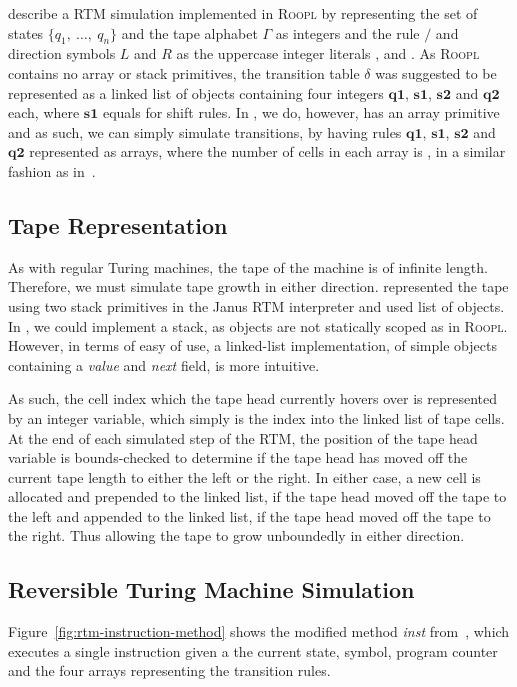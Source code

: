 \citeauthor{th:roopl} describe a RTM simulation implemented in \textsc{Roopl} by representing the set of states $\{q_1,\ \dots,\ q_n\}$ and the tape alphabet $\Gamma$ as integers and the rule $/$ and direction symbols $L$ and $R$ as the uppercase integer literals ,  and . As \textsc{Roopl} contains no array or stack primitives, the transition table $\delta$ was suggested to be represented as a linked list of objects containing four integers ${\textbf{q1}}$, ${\textbf{s1}}$, ${\textbf{s2}}$ and ${\textbf{q2}}$ each, where ${\textbf{s1}}$ equals  for shift rules. In \rooplpp, we do, however, has an array primitive and as such, we can simply simulate transitions, by having rules ${\textbf{q1}}$, ${\textbf{s1}}$, ${\textbf{s2}}$ and ${\textbf{q2}}$ represented as arrays, where the number of cells in each array is , in a similar fashion as in~\cite{ty:ejanus}.

\subsection{Tape Representation}
\label{subsec:tape-representation}
As with regular Turing machines, the tape of the machine is of infinite length. Therefore, we must simulate tape growth in either direction.
\citeauthor{ty:ejanus} represented the tape using two stack primitives in the Janus RTM interpreter and \citeauthor{th:roopl} used list of objects. In \rooplpp, we could implement a stack, as objects are not statically scoped as in \textsc{Roopl}. However, in terms of easy of use, a linked-list implementation, of simple objects containing a \textit{value} and \textit{next} field, is more intuitive.

As such, the cell index which the tape head currently hovers over is represented by an integer variable, which simply is the index into the linked list of tape cells. At the end of each simulated step of the RTM, the position of the tape head variable is bounds-checked to determine if the tape head has moved off the current tape length to either the left or the right. In either case, a new cell is allocated and prepended to the linked list, if the tape head moved off the tape to the left and appended to the linked list, if the tape head moved off the tape to the right. Thus allowing the tape to grow unboundedly in either direction.

\subsection{Reversible Turing Machine Simulation}
\label{subsec:rtm-simulation}
Figure~\ref{fig:rtm-instruction-method} shows the modified method \textit{inst} from~\cite{ty:ejanus}, which executes a single instruction given a the current state, symbol, program counter and the four arrays representing the transition rules. 

